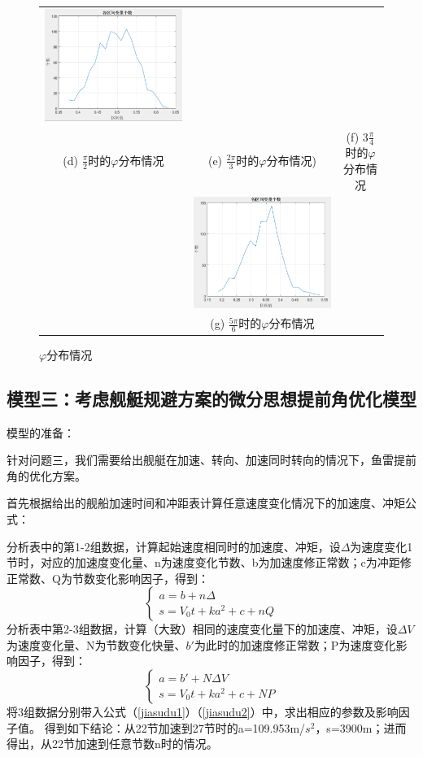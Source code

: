 \documentclass[12pt]{article}%
\begin{document}
\begin{figure}
\begin{tabular}{ccc}
		\includegraphics[width=0.33\linewidth]{TIM20180528035239.png} \\
		(d) $\frac{\pi}{2}$时的$\varphi$分布情况 & (e)  $\frac{2\pi}{3}$时的$\varphi$分布情况)&(f) $3\frac{\pi}{4}$时的$\varphi$分布情况\\
			 & 
		\includegraphics[width=0.33\linewidth]{TIM20180528035311.png}  &
		 \\
		 		&(g)  $\frac{5\pi}{6}$时的$\varphi$分布情况& \\
	\end{tabular}
	\caption{$\varphi$分布情况 }
	\label{fig:label3}
	\vspace{-0.5em}
\end{figure}
\subsection{模型三：考虑舰艇规避方案的微分思想提前角优化模型}
模型的准备：

针对问题三，我们需要给出舰艇在加速、转向、加速同时转向的情况下，鱼雷提前角的优化方案。

首先根据给出的舰船加速时间和冲距表计算任意速度变化情况下的加速度、冲矩公式：

分析表中的第1-2组数据，计算起始速度相同时的加速度、冲矩，设$\Delta$为速度变化1节时，对应的加速度变化量、n为速度变化节数、b为加速度修正常数；c为冲距修正常数、Q为节数变化影响因子，得到：
\begin{equation}\label{jiasudu1}
\left\{ 
\begin{array}{c}
a=b+n\Delta \\
s=V_0t+ka^2+c+nQ
\end{array} \right.  
\end{equation}
分析表中第2-3组数据，计算（大致）相同的速度变化量下的加速度、冲矩，设$\Delta V$为速度变化量、N为节数变化快量、$b'$为此时的加速度修正常数；P为速度变化影响因子，得到：
\begin{equation}\label{jiasudu2}
\left\{ 
\begin{array}{c}
a=b'+N\Delta V\\
s=V_0t+ka^2+c+NP
\end{array} \right.  
\end{equation}
将3组数据分别带入公式（\ref{jiasudu1}）（\ref{jiasudu2}）中，求出相应的参数及影响因子值。
得到如下结论：从22节加速到27节时的a=109.953m/$s^2$，s=3900m；进而得出，从22节加速到任意节数n时的情况。
\end{document}
